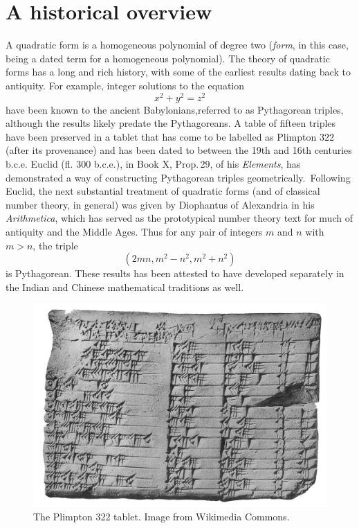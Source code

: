 
\chapter{A historical overview}
\label{chap:history}


A quadratic form is a homogeneous polynomial of degree two (\emph{form}, in this case, being a dated term for a homogeneous polynomial). The theory of quadratic forms has a long and rich history, with some of the earliest results dating back to antiquity. For example, integer solutions to the equation
\[
    x^2 + y^2 = z^2 
\]
have been known to the ancient Babylonians,referred to as Pythagorean triples, although the results likely predate the Pythagoreans. A table of fifteen triples have been preserved in a tablet that has come to be labelled as Plimpton 322 (after its provenance) and has been dated to between the 19th and 16th centuries {\sc b.c.e.} \cite{robson2002words} Euclid (fl. 300 {\sc b.c.e.}), in Book X, Prop.\,29, of his \emph{Elements}, has demonstrated a way of constructing Pythagorean triples geometrically.\,\cite{euclid1956elements} Following Euclid, the next substantial treatment of quadratic forms (and of classical number theory, in general) was given by Diophantus of Alexandria in his \emph{Arithmetica}, which has served as the prototypical number theory text for much of antiquity and the Middle Ages. \cite{katz2009history} Thus for any pair of integers \(m\) and \(n\) with \(m > n\), the triple
\[
    (2mn, m^2 - n^2, m^2 + n^2)
\]
is Pythagorean. These results has been attested to have developed separately in the Indian and Chinese mathematical traditions as well. \cite{weil1984number}


\begin{figure}
    \centering
    \includegraphics[width=\textwidth]{assets/Plimpton_322.jpg}
    \caption[The Plimpton 322 tablet.]{The Plimpton 322 tablet. Image from Wikimedia Commons.}
    \label{fig:plimpton-322}
\end{figure}

